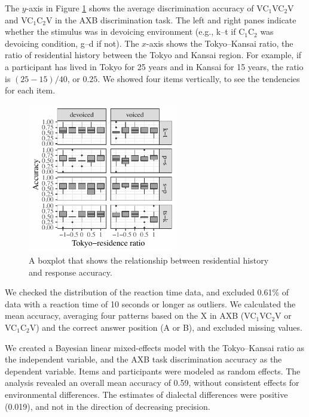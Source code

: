 \documentclass[a4paper,11pt,twocolumn]{article}
\begin{document}
The $y$-axis in Figure \ref{fig:axb_results} shows the average discrimination accuracy of VC$_\text{1}$VC$_\text{2}$V and VC$_\text{1}$C$_\text{2}$V in the AXB discrimination task. The left and right panes indicate whether the stimulus was in devoicing environment (e.g., k--t if C$_\text{1}$C$_\text{2}$ was devoicing condition, g--d if not). The $x$-axis shows the Tokyo--Kansai ratio, the ratio of residential history between the Tokyo and Kansai region. For example, if a participant has lived in Tokyo for 25 years and in Kansai for 15 years, the ratio is $(25-15)/40$, or $0.25$. We showed four items vertically, to see the tendencies for each item.
\begin{figure}[!ht]
\begin{center}
\includegraphics[width=6.5cm]{../results/artifact/results_axb_allophone_gray.pdf}
\caption{A boxplot that shows the relationship between residential history and response accuracy.}\label{fig:axb_results}
\end{center}
\end{figure}

We checked the distribution of the reaction time data, and excluded 0.61\% of data with a reaction time of 10 seconds or longer as outliers. We calculated the mean accuracy, averaging four patterns based on the X in AXB (VC$_\text{1}$VC$_\text{2}$V or VC$_\text{1}$C$_\text{2}$V) and the correct answer position (A or B), and excluded missing values.

We created a Bayesian linear mixed-effects model \cite{lme4, rstanarm, easystats} with the Tokyo--Kansai ratio as the independent variable, and the AXB task discrimination accuracy as the dependent variable. Items and participants were modeled as random effects. The analysis revealed an overall mean accuracy of 0.59, without consistent effects for environmental differences. The estimates of dialectal differences were positive (0.019), and not in the direction of decreasing precision.
\end{document}
